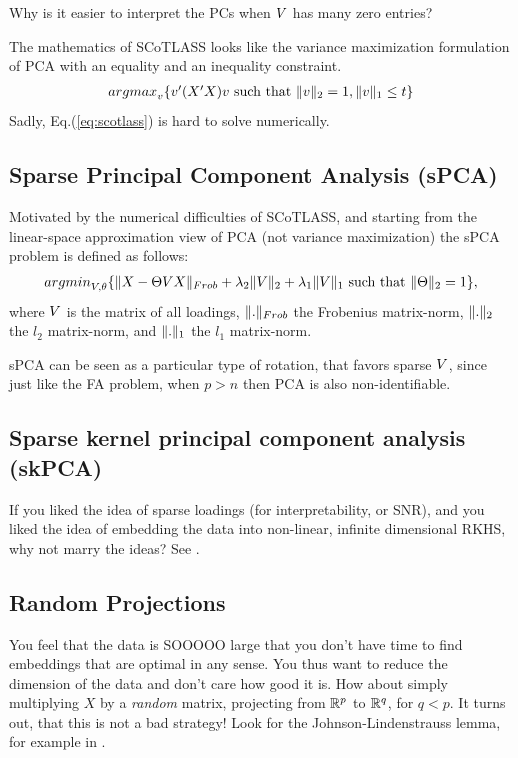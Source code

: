 \documentclass[12pt,a4paper]{article}
\begin{document}
\begin{think}
	Why is it easier to interpret the PCs when $V$ has many zero entries?
\end{think}

The mathematics of SCoTLASS looks like the variance maximization formulation of PCA with an equality and an inequality constraint.
\begin{align}
\label{eq:scotlass}
	\textstyle{\mathop{argmax}_{v}}\{ v'(X'X)v  \text{ such that } \Vert v \Vert_2=1, \Vert v \Vert_1\leq t  \}
\end{align}
Sadly, Eq.(\ref{eq:scotlass}) is hard to solve numerically.


\subsection{Sparse Principal Component Analysis (sPCA)}
\label{sec:sPCA}

Motivated by the numerical difficulties of SCoTLASS, and starting from the linear-space approximation view of PCA (not variance maximization) the sPCA problem is defined as follows:
\begin{align}
\label{eq:spca}
	\textstyle{\mathop{argmin}_{V,\theta}}\{ \Vert X-\Theta V X \Vert_{Frob} + \lambda_2 \Vert V \Vert_2 + \lambda_1 \Vert V \Vert_1 \text{ such that } \Vert \Theta \Vert_2=1 \},
\end{align}
where $V$ is the matrix of all loadings, $\Vert . \Vert_{Frob}$ the Frobenius matrix-norm, $\Vert . \Vert_2$ the $l_2$ matrix-norm, and $\Vert . \Vert_1$ the $l_1$ matrix-norm.


\begin{remark}
	sPCA can be seen as a particular type of rotation, that favors sparse $V$, since just like the FA problem, when $p>n$ then PCA is also non-identifiable. 
\end{remark}





\subsection{Sparse kernel principal component analysis (skPCA)}
If you liked the idea of sparse loadings (for interpretability, or SNR), and you liked the idea of embedding the data into non-linear, infinite dimensional RKHS, why not marry the ideas?
See \citet{tipping2001sparse}.



\subsection{Random Projections}
You feel that the data is SOOOOO large that you don't have time to find embeddings that are optimal in any sense. 
You thus want to reduce the dimension of the data and don't care how good it is. 
How about simply multiplying $X$ by a \emph{random} matrix, projecting from $\mathbb{R}^p$ to $\mathbb{R}^q$, for $q<p$.
It turns out, that this is not a bad strategy!
Look for the Johnson-Lindenstrauss lemma, for example in \citet{mohri2012foundations}.


\newpage


\end{document}
